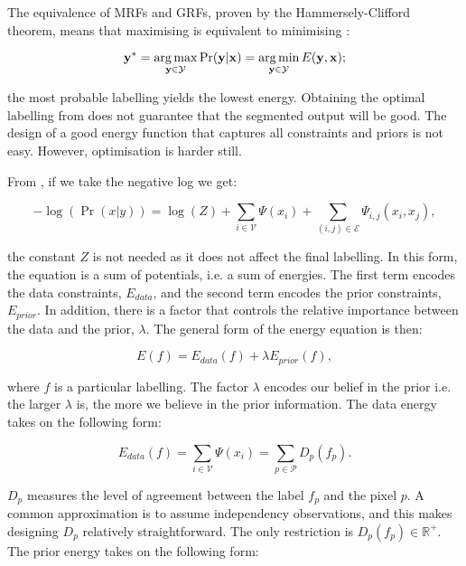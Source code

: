 The equivalence of MRFs and GRFs, proven by the Hammersely-Clifford theorem, means that maximising  is equivalent to minimising  \citep{Winkler2006}:

\begin{equation}
\mathbf{y^*} = \operatorname*{arg\,max}_{\mathbf{y} \in \mathcal{Y}}\Pr(\mathbf{y}|\mathbf{x}) = \operatorname*{arg\,min}_{\mathbf{y} \in \mathcal{Y}}E(\mathbf{y},\mathbf{x});
\label{eq:mrf_grf_equivaleance}
\end{equation}

the most probable labelling yields the lowest energy.
Obtaining the optimal labelling from  does not guarantee that the segmented output will be good.
The design of a good energy function that captures all constraints and priors is not easy.
However, optimisation is harder still.

From , if we take the negative log we get:

\begin{equation}
	-\log(\Pr(x|y)) = \log(Z) + \sum_{i \in \mathcal{V}}\Psi(x_i) + \sum_{(i,j) \in \mathcal{E}}\Psi_{i,j}(x_i,x_j),
\end{equation}

the constant $Z$ is not needed as it does not affect the final labelling.
In this form, the equation is a sum of potentials, i.e. a sum of energies.
The first term encodes the data constraints, $E_{data}$, and the second term encodes the prior constraints, $E_{prior}$.
In addition, there is a factor that controls the relative importance between the data and the prior, $\lambda$.
The general form of the energy equation is then:

\begin{equation}
	E(f) = E_{data}(f) + \lambda E_{prior}(f),
	\label{eq:generalform}
\end{equation}

where $f$ is a particular labelling.
The factor $\lambda$ encodes our belief in the prior i.e. the larger $\lambda$ is, the more we believe in the prior information.
The data energy takes on the following form:

\begin{equation}
	E_{data}(f) = \sum_{i \in \mathcal{V}} \Psi(x_i) =  \sum_{p \in \mathcal{P}}D_p(f_p).
	\label{eq:dataenergy}
\end{equation}

$D_p$ measures the level of agreement between the label $f_p$ and the pixel $p$.
A common approximation is to assume independency observations, and this makes designing $D_p$ relatively straightforward.
The only restriction is  $D_p(f_p) \in \mathbb{R}^{+}$.
The prior energy takes on the following form:

